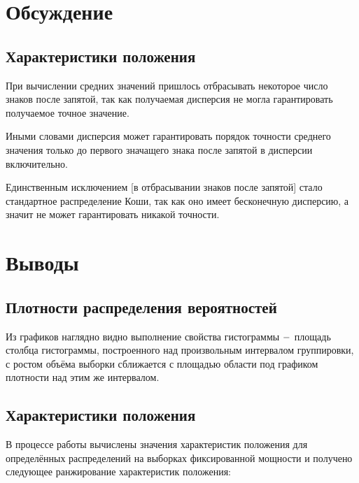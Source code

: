 \documentclass[a4]{article}
\begin{document}
\section{Обсуждение}
\subsection{Характеристики положения}
\par При вычислении средних значений пришлось отбрасывать некоторое число знаков после запятой, так как получаемая дисперсия не могла гарантировать получаемое точное значение. \par Иными словами дисперсия может гарантировать порядок точности среднего значения только до первого значащего знака после запятой в дисперсии включительно. \par Единственным исключением [в отбрасывании знаков после запятой] стало стандартное распределение Коши, так как оно имеет бесконечную дисперсию, а значит не может гарантировать никакой точности.

\section{Выводы}

\subsection{Плотности распределения вероятностей}
\par Из графиков наглядно видно выполнение свойства гистограммы $\--$ площадь столбца гистограммы, построенного над произвольным интервалом группировки, с ростом объёма выборки сближается с площадью области под графиком плотности над этим же интервалом.

\subsection{Характеристики положения}
\par В процессе работы вычислены значения характеристик положения для определённых распределений на выборках фиксированной мощности и получено следующее ранжирование характеристик положения:
\end{document}
